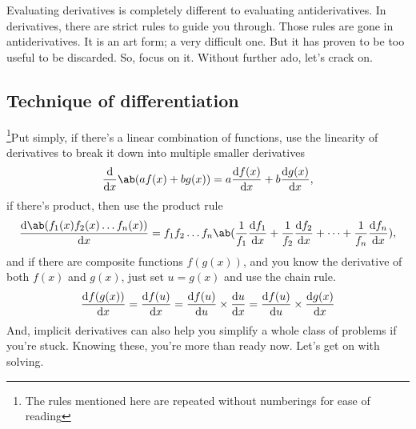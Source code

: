 Evaluating derivatives is completely different to evaluating antiderivatives. In derivatives, there are strict rules to guide you through. Those rules are gone in antiderivatives. It is an art form; a very difficult one. But it has proven to be too useful to be discarded. So, focus on it. Without further ado, let's crack on. 

\subsection{Technique of differentiation}

\footnote{The rules mentioned here are repeated without numberings for ease of reading}Put simply, if there's a linear combination of functions, use the linearity of derivatives to break it down into multiple smaller derivatives
\begin{equation*}
  \odv*{\ab(af(x) + bg(x))}{x} = a\odv{f(x)}{x} + b\odv{g(x)}{x},
\end{equation*}
if there's product, then use the product rule
\begin{equation*}
  \odv{\ab(f_1(x)f_2(x)\dots f_n(x))}{x} = f_1f_2\dots f_n\ab(\frac{1}{f_1}\odv{f_1}{x} + \frac{1}{f_2}\odv{f_2}{x} + \dots + \frac{1}{f_n}\odv{f_n}{x}),
\end{equation*}
and if there are composite functions $f(g(x))$, and you know the derivative of both $f(x)$ and $g(x)$, just set $u = g(x)$ and use the chain rule.
\begin{equation*}
  \odv{f(g(x))}{x} = \odv{f(u)}{x} = \odv{f(u)}{u} \times \odv{u}{x} = \odv{f(u)}{u} \times \odv{g(x)}{x}
\end{equation*}
And, implicit derivatives can also help you simplify a whole class of problems if you're stuck. Knowing these, you're more than ready now. Let's get on with solving.

